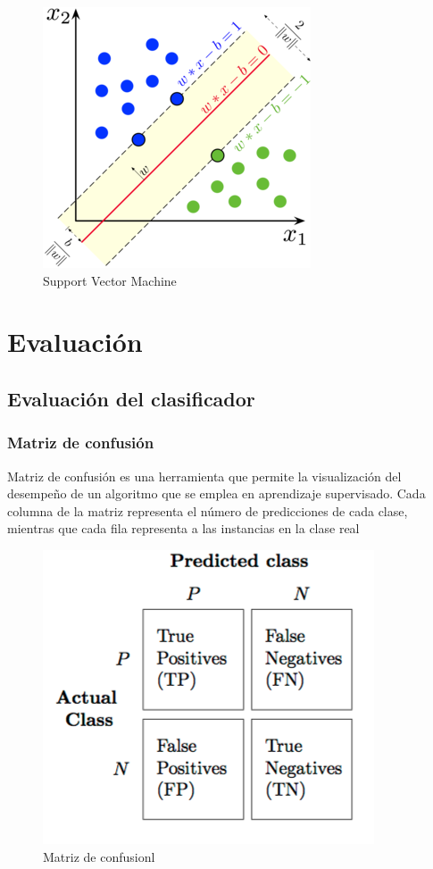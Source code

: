 \documentclass[a4paper,11pt]{report}
\begin{document}
\begin{figure}[h]
	\centering
	\includegraphics[scale=2]{svm}
	\caption{Support Vector Machine}
	\label{fig:svm}
\end{figure}
\section{Evaluación }
\subsection{Evaluación del clasificador}
\subsubsection{Matriz de confusión}
Matriz de confusión es una herramienta que permite la visualización del desempeño de un algoritmo que se emplea en aprendizaje supervisado. Cada columna de la matriz representa el número de predicciones de cada clase, mientras que cada fila representa a las instancias en la clase real

\begin{figure}[h]
	\centering
	\includegraphics[scale=0.4]{confusion}
	\caption{Matriz de confusionl}
	\label{fig:Matriz de confusion}
\end{figure}
\end{document}
